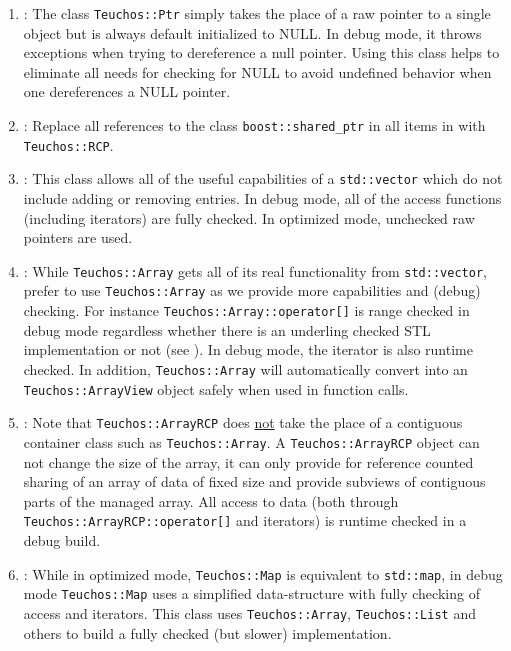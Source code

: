 \begin{enumerate}
{}\item\GCGTeuchosPtr: The class {}\texttt{Teuchos\-::Ptr} simply takes the place
of a raw pointer to a single object but is always default initialized to NULL.
In debug mode, it throws exceptions when trying to dereference a null pointer.
Using this class helps to eliminate all needs for checking for NULL to avoid
undefined behavior when one dereferences a NULL pointer.

{}\item\GCGTeuchosRCP: Replace all references to the class
{}\texttt{boost::\-shared\_ptr} in all items in {}\cite{C++CodingStandards05}
with {}\texttt{Teuchos::\-RCP}.

{}\item\GCGTeuchosArrayView: This class allows all of the useful capabilities of a
{}\texttt{std::vector} which do not include adding or removing entries.  In
debug mode, all of the access functions (including iterators) are fully
checked.  In optimized mode, unchecked raw pointers are used.

{}\item\GCGTeuchosArray: While {}\texttt{Teuchos::\-Array} gets all of its real
functionality from {}\texttt{std::\-vector}, prefer to use
{}\texttt{Teuchos::\-Array} as we provide more capabilities and (debug)
checking.  For instance {}\texttt{Teuchos::\-Array::\-operator[]} is range
checked in debug mode regardless whether there is an underling checked STL
implementation or not (see {}\cite[Item 83]{C++CodingStandards05}).  In debug
mode, the iterator is also runtime checked.  In addition,
{}\texttt{Teuchos\-::Array} will automatically convert into an
{}\texttt{Teuchos\-::ArrayView} object safely when used in function calls.

{}\item\GCGTeuchosArrayRCP: Note that {}\texttt{Teuchos::ArrayRCP} does
{}\underline{not} take the place of a contiguous container class such as
{}\texttt{Teuchos::\-Array}.  A {}\texttt{Teuchos::ArrayRCP} object can not
change the size of the array, it can only provide for reference counted
sharing of an array of data of fixed size and provide subviews of contiguous
parts of the managed array.  All access to data (both through
{}\texttt{Teuchos::\-ArrayRCP::\-operator[]} and iterators) is runtime checked
in a debug build.

{}\item\GCGTeuchosMap: While in optimized mode, {}\texttt{Teuchos\-::Map} is
equivalent to {}\texttt{std\-::map}, in debug mode {}\texttt{Teuchos\-::Map}
uses a simplified data-structure with fully checking of access and iterators.
This class uses {}\texttt{Teuchos\-::Array}, {}\texttt{Teuchos::List} and
others to build a fully checked (but slower) implementation.


\end{enumerate}
